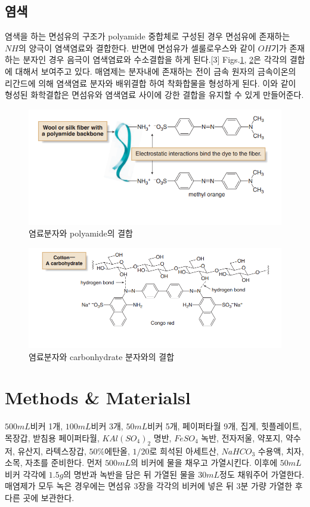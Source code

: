 \documentclass[%
 reprint,
 amsmath,amssymb,
 aps,
]{revtex4-2}
\begin{document}
\subsection{\label{sec:level2}염색}
염색을 하는 면섬유의 구조가 polyamide 중합체로 구성된 경우 면섬유에 존재하는 $NH$의 양극이 염색염료와 결합한다. 반면에 면섬유가 셀룰로우스와 같이 $OH$기가 존재하는 분자인 경우 음극이 염색염료와 수소결합을 하게 된다.[3] Figs.\ref{fig:NH3_bond}, \ref{fig:OH_bond}은 각각의 결합에 대해서 보여주고 있다. 매염제는 분자내에 존재하는 전이 금속 원자의 금속이온의 리간드에 의해 염색염료 분자와 배위결합 하여 착화합물을 형성하게 된다. 이와 같이 형성된 화학결합은 면섬유와 염색염료 사이에 강한 결합을 유지할 수 있게 만들어준다.
\begin{figure}[htbp]
	\includegraphics[width = 0.9\linewidth]{NH3_bond.png}%
	\caption{\label{fig:NH3_bond}염료분자와 polyamide의 결합}
\end{figure}
\begin{figure}[htbp]
	\includegraphics[width = 0.9\linewidth]{OH_bond.png}%
	\caption{\label{fig:OH_bond}염료분자와 carbonhydrate 분자와의 결합}
\end{figure}

\section{\label{sec:level1}Methods \& Materialsl}
$500mL$비커 1개, $100mL$비커 3개, $50mL$비커 5개, 페이퍼타월 9개, 집게, 힛플레이트, 목장갑, 받침용 페이퍼타월, $KAl(SO_{4})_{2}$ 명반, $FeSO_{4}$ 녹반, 전자저울, 약포지, 약수저, 유산지, 라텍스장갑, $50\%$에탄올, $1/20$로 희석된 아세트산, $NaHCO_{3}$ 수용액, 치자, 소목, 자초를 준비한다. 먼저 $500mL$의 비커에 물을 채우고 가열시킨다. 이후에 $50mL$비커 각각에 $1.5g$의 명반과 녹반을 담은 뒤 가열된 물을 $30mL$정도 채워주어 가열한다. 매염제가 모두 녹은 경우에는 면섬유 3장을 각각의 비커에 넣은 뒤 3분 가량 가열한 후 다른 곳에 보관한다.\\
\end{document}
